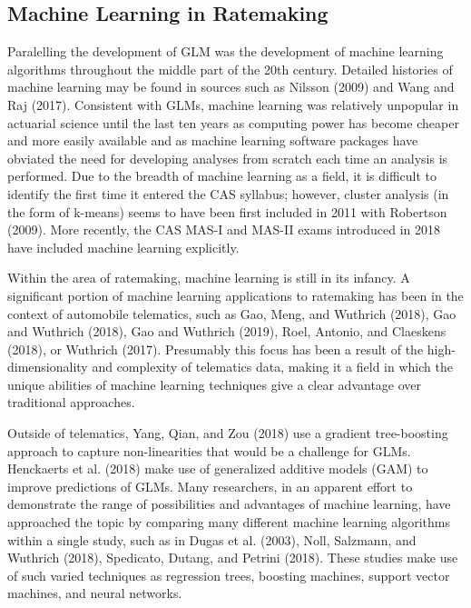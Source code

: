 \documentclass[preprint, 3p, twocolumn, letterpaper, 10pt]{elsarticle} %
\begin{document}
\hypertarget{machine-learning-in-ratemaking}{%
\subsection{Machine Learning in Ratemaking}\label{machine-learning-in-ratemaking}}

Paralelling the development of GLM was the development of machine learning
algorithms throughout the middle part of the 20th century. Detailed histories
of machine learning may be found in sources such as Nilsson (2009) and
Wang and Raj (2017). Consistent with GLMs, machine learning was relatively unpopular
in actuarial science until the last ten years as computing power has become cheaper
and more easily available and as machine learning software packages have obviated
the need for developing analyses from scratch each time an analysis is performed.
Due to the breadth of machine learning as a field, it is difficult to identify
the first time it entered the CAS syllabus; however, cluster analysis (in the
form of k-means) seems to have been first included in 2011 with Robertson (2009).
More recently, the CAS MAS-I and MAS-II exams introduced in 2018 have included
machine learning explicitly.

Within the area of ratemaking, machine learning is still in its infancy. A
significant portion of machine learning applications to ratemaking has been in
the context of automobile telematics, such as Gao, Meng, and Wuthrich (2018), Gao and Wuthrich (2018), Gao and Wuthrich (2019),
Roel, Antonio, and Claeskens (2018), or Wuthrich (2017). Presumably this focus has been a result of the
high-dimensionality and complexity of telematics data, making it a field in
which the unique abilities of machine learning techniques give a clear
advantage over traditional approaches.

Outside of telematics, Yang, Qian, and Zou (2018) use a gradient tree-boosting approach to
capture non-linearities that would be a challenge for GLMs. Henckaerts et al. (2018)
make use of generalized additive models (GAM) to improve predictions of GLMs.
Many researchers, in an apparent effort to demonstrate the range of possibilities
and advantages of machine learning, have approached the topic by comparing many
different machine learning algorithms within a single study, such as in
Dugas et al. (2003), Noll, Salzmann, and Wuthrich (2018), Spedicato, Dutang, and Petrini (2018). These studies make use of such varied
techniques as regression trees, boosting machines, support vector machines, and
neural networks.
\end{document}
